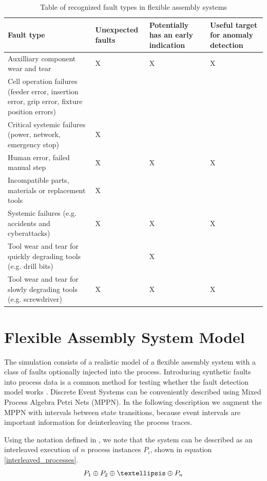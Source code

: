 \documentclass[journal]{IEEEtran}
\begin{document}
\begin{table}[!t]
\renewcommand{\arraystretch}{1.3}
\caption{Table of recognized fault types in flexible assembly systems}
\label{faults}
\centering
\begin{tabular}{|p{25mm}|p{15mm}|p{15mm}|p{15mm}|}
\hline
Fault type & Unexpected faults & Potentially has an early indication & Useful target for anomaly detection \\
\hline
\hline
Auxilliary component wear and tear & X & X & X \\
\hline
Cell operation failures (feeder error, insertion error, grip error, fixture position errors) & & & \\
\hline
Critical systemic failures (power, network, emergency stop) & X & & \\
\hline
Human error, failed manual step & X & X & X \\
\hline
Incompatible parts, materials or replacement tools & X & & \\
\hline
Systemic failures (e.g. accidents and cyberattacks) & X & X & X \\
\hline
Tool wear and tear for quickly degrading tools (e.g. drill bits) & & X & \\
\hline
Tool wear and tear for slowly degrading tools (e.g. screwdriver) & X & X & X \\
\hline
\end{tabular}
\end{table}

\section{Flexible Assembly System Model}

The simulation consists of a realistic model of a flexible assembly system with a class of faults optionally injected into the process.
Introducing synthetic faults into process data is a common method for testing whether the fault detection model works \cite{able2016model}.
Discrete Event Systems can be conveniently
described using Mixed Process Algebra Petri Nets (MPPN)\cite{falkman2001modeling}. In the following description we augment the MPPN with intervals between state transitions,
because event intervals are important information for deinterleaving the process traces.

Using the notation defined in \cite{falkman2001combined}, we note that the system can be described as an interleaved execution of $ n $ process instances $ P_i $, shown in
equation \ref{interleaved_processes}.
\begin{equation}
 P_1 \oplus P_2 \oplus \textellipsis \oplus P_n
 \label{interleaved_processes}
\end{equation}
\end{document}
